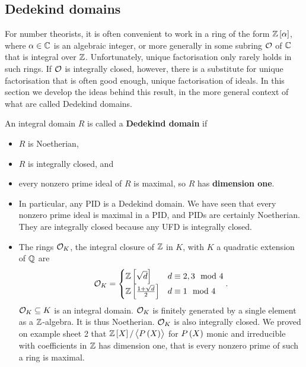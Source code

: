 
\subsection{Dedekind domains}

For number theorists, it is often convenient to work in a ring of the form $ \Z\sbr{\alpha} $, where $ \alpha \in \mathbb{C} $ is an algebraic integer, or more generally in some subring $ \mathcal{O} $ of $ \mathbb{C} $ that is integral over $ \mathbb{Z} $. Unfortunately, unique factorisation only rarely holds in such rings. If $ \mathcal{O} $ is integrally closed, however, there is a substitute for unique factorisation that is often good enough, unique factorisation of ideals. In this section we develop the ideas behind this result, in the more general context of what are called Dedekind domains.

\begin{definition}
An integral domain $ R $ is called a \textbf{Dedekind domain} if
\begin{itemize}
\item $ R $ is Noetherian,
\item $ R $ is integrally closed, and
\item every nonzero prime ideal of $ R $ is maximal, so $ R $ has \textbf{dimension one}.
\end{itemize}
\end{definition}

\begin{example*}
\hfill
\begin{itemize}
\item In particular, any PID is a Dedekind domain. We have seen that every nonzero prime ideal is maximal in a PID, and PIDs are certainly Noetherian. They are integrally closed because any UFD is integrally closed.
\item The rings $ \mathcal{O}_K $, the integral closure of $ \mathbb{Z} $ in $ K $, with $ K $ a quadratic extension of $ \mathbb{Q} $ are
$$ \OO_K =
\begin{cases}
\Z\sbr{\sqrt{d}} & d \equiv 2, 3 \mod 4 \\
\Z\sbr{\tfrac{1 + \sqrt{d}}{2}} & d \equiv 1 \mod 4
\end{cases}.
$$
$ \mathcal{O}_K \subseteq K $ is an integral domain. $ \mathcal{O}_K $ is finitely generated by a single element as a $ \mathbb{Z} $-algebra. It is thus Noetherian. $ \mathcal{O}_K $ is also integrally closed. We proved on example sheet 2 that $ \Z\sbr{X} / \abr{P\br{X}} $ for $ P\br{X} $ monic and irreducible with coefficients in $ \mathbb{Z} $ has dimension one, that is every nonzero prime of such a ring is maximal.
\end{itemize}
\end{example*}

